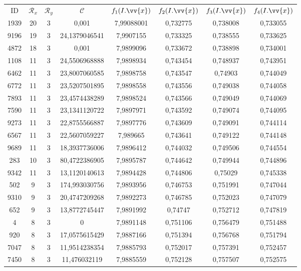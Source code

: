 \scriptsize
\begin{longtable}{|c|c|c|c|c|c|c|c|}
\hline
ID & $\mathscr{R}_x$ & $\mathscr{R}_y$ & $\mathscr{C}$ & $f_1(I.\vv{x})$ & $f_2(I.\vv{x})$ & $f_3(I.\vv{x})$ & $f_4(I.\vv{x})$ \\
1939 & 20 & 3 & 0,001 & 7,99088001 & 0,732775 & 0,738008 & 0,733055 \\
9196 & 19 & 3 & 24,1379046541 & 7,9907155 & 0,733325 & 0,738555 & 0,733625 \\
4872 & 18 & 3 & 0,001 & 7,9899096 & 0,733672 & 0,738898 & 0,734001 \\
1108 & 11 & 3 & 24,5506968888 & 7,9898934 & 0,743454 & 0,748937 & 0,743951 \\
6462 & 11 & 3 & 23,8007060585 & 7,9898758 & 0,743547 & 0,74903 & 0,744049 \\
6772 & 11 & 3 & 23,5207501895 & 7,9898558 & 0,743556 & 0,749038 & 0,744058 \\
7893 & 11 & 3 & 23,4574438289 & 7,9898524 & 0,743566 & 0,749049 & 0,744069 \\
7590 & 11 & 3 & 23,1341120722 & 7,9897971 & 0,743592 & 0,749074 & 0,744095 \\
9273 & 11 & 3 & 22,8755566887 & 7,9897776 & 0,743609 & 0,749091 & 0,744114 \\
6567 & 11 & 3 & 22,5607059227 & 7,989665 & 0,743641 & 0,749122 & 0,744148 \\
9689 & 11 & 3 & 18,3937736006 & 7,9896412 & 0,744032 & 0,749506 & 0,744554 \\
283 & 10 & 3 & 80,4722386905 & 7,9895787 & 0,744642 & 0,749944 & 0,744896 \\
9342 & 11 & 3 & 13,1120140613 & 7,9894428 & 0,744806 & 0,75029 & 0,745338 \\
502 & 9 & 3 & 174,993030756 & 7,9893956 & 0,746753 & 0,751991 & 0,747044 \\
9310 & 9 & 3 & 20,4747209268 & 7,9892273 & 0,746785 & 0,752023 & 0,747079 \\
652 & 9 & 3 & 13,8772745447 & 7,9891992 & 0,74747 & 0,752712 & 0,747819 \\
4 & 8 & 3 & 0 & 7,9891148 & 0,751106 & 0,756479 & 0,751488 \\
920 & 8 & 3 & 17,0575615429 & 7,9887166 & 0,751394 & 0,756768 & 0,751794 \\
7047 & 8 & 3 & 11,9514238354 & 7,9885793 & 0,752017 & 0,757391 & 0,752457 \\
7450 & 8 & 3 & 11,476032119 & 7,9885559 & 0,752128 & 0,757507 & 0,752575 \\

\end{longtable}
